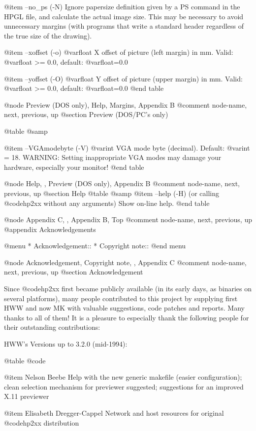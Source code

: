 @item --no_ps (-N)
Ignore papersize definition given by a PS command in the HPGL file, and
calculate the actual image size. This may be necessary to avoid unnecessary
margins (with programs that write a standard header regardless of the true
size of the drawing).

@item --xoffset (-o) @var{float}
X offset of picture (left  margin) in mm.
Valid: @var{float} >= 0.0, default: @var{float}=0.0

@item --yoffset (-O) @var{float}
Y offset of picture (upper  margin) in mm.
Valid: @var{float} >= 0.0, default: @var{float}=0.0
@end table



@node Preview (DOS only), Help, Margins, Appendix B
@comment  node-name,  next,  previous,  up
@section  Preview (DOS/PC's only)

@table @samp

@item --VGAmodebyte (-V) @var{int}
VGA mode byte (decimal). Default: @var{int} = 18.
WARNING: Setting inappropriate VGA modes may damage your hardware,
especially your monitor!
@end table


@node Help, , Preview (DOS only), Appendix B
@comment  node-name,  next,  previous,  up
@section  Help
@table @samp
@item --help (-H)
(or calling @code{hp2xx} without any arguments)  Show on-line help.
@end table



@node Appendix C, , Appendix B, Top
@comment  node-name,  next,  previous,  up
@appendix Acknowledgements

@menu
* Acknowledgement::
* Copyright note::
@end menu


@node Acknowledgement, Copyright note, , Appendix C
@comment  node-name,  next,  previous,  up
@section Acknowledgement

Since @code{hp2xx} first became publicly available (in its early days, as 
binaries on several platforms), many people contributed to this project by 
supplying first HWW and now MK with valuable suggestions, code patches and 
reports. Many thanks to all of them!
It is a pleasure to especially thank the following people for their
outstanding contributions:

HWW's Versions up to 3.2.0 (mid-1994):

@table @code

@item Nelson Beebe
Help with the new generic makefile (easier configuration);
clean selection mechanism for previewer suggested;
suggestions for an improved X.11 previewer

@item Elisabeth Dregger-Cappel
Network and host resources for original @code{hp2xx} distribution

